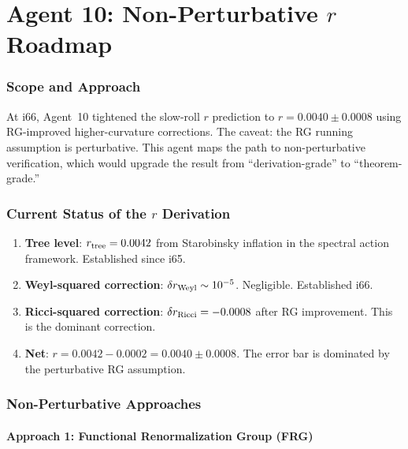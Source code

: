 \documentclass[11pt,a4paper]{article}
\begin{document}
\part{Agent 10: Non-Perturbative $r$ Roadmap}
\label{part:r-nonpert}

\section{Scope and Approach}

At i66, Agent~10 tightened the slow-roll $r$ prediction to $r = 0.0040 \pm 0.0008$ using RG-improved higher-curvature corrections. The caveat: the RG running assumption is perturbative. This agent maps the path to non-perturbative verification, which would upgrade the result from ``derivation-grade'' to ``theorem-grade.''

\section{Current Status of the $r$ Derivation}

\begin{enumerate}
\item \textbf{Tree level}: $r_{\rm tree} = 0.0042$ from Starobinsky inflation in the spectral action framework. Established since i65.

\item \textbf{Weyl-squared correction}: $\delta r_{\rm Weyl} \sim 10^{-5}$. Negligible. Established i66.

\item \textbf{Ricci-squared correction}: $\delta r_{\rm Ricci} = -0.0008$ after RG improvement. This is the dominant correction.

\item \textbf{Net}: $r = 0.0042 - 0.0002 = 0.0040 \pm 0.0008$. The error bar is dominated by the perturbative RG assumption.
\end{enumerate}

\section{Non-Perturbative Approaches}

\subsection{Approach 1: Functional Renormalization Group (FRG)}
\end{document}
